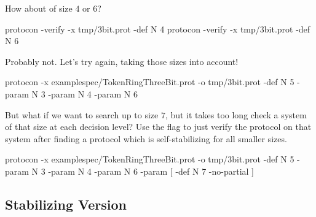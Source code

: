 How about of size $4$ or $6$?
\begin{code}
protocon -verify -x tmp/3bit.prot -def N 4
protocon -verify -x tmp/3bit.prot -def N 6
\end{code}

Probably not.
Let's try again, taking those sizes into account!
\begin{code}
protocon -x examplespec/TokenRingThreeBit.prot -o tmp/3bit.prot -def N 5 -param N 3 -param N 4 -param N 6
\end{code}

But what if we want to search up to size $7$, but it takes too long check a system of that size at each decision level?
Use the  flag to just verify the protocol on that system after finding a protocol which is self-stabilizing for all smaller sizes.
\begin{code}
protocon -x examplespec/TokenRingThreeBit.prot -o tmp/3bit.prot -def N 5 -param N 3 -param N 4 -param N 6 -param [ -def N 7 -no-partial ]
\end{code}

\subsection{Stabilizing Version}




